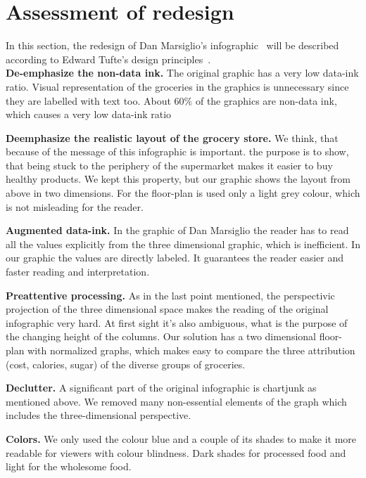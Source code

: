 \section{Assessment of redesign}

In this section, the redesign of Dan Marsiglio's
infographic~\cite{DanMarsiglio2008} will be described according to Edward
Tufte's design principles~\cite{Tufte2001}.\\

\textbf{De-emphasize the non-data ink.} The original graphic has a very
low data-ink ratio. Visual representation of the groceries in the graphics
is unnecessary since they are labelled with text too. About 60\% of
the graphics are non-data ink, which causes a very low data-ink ratio

\textbf{Deemphasize the realistic layout of the grocery store.} We
think, that because of the message of this infographic is important. the
purpose is to show, that being stuck to the periphery of the supermarket
makes it easier to buy healthy products. We kept this property, but our
graphic shows the layout from above in two dimensions. For the floor-plan is
used only a light grey colour, which is not misleading for the reader.

\textbf{Augmented data-ink.} In the graphic of Dan Marsiglio the reader
has to read all the values explicitly from the three dimensional graphic, which
is inefficient. In our graphic the values are directly labeled. It
guarantees the reader easier and faster reading and interpretation.

\textbf{Preattentive processing.} As in the last point mentioned, the
perspectivic projection of the three dimensional space makes the reading of
the original infographic very hard. At first sight it's also ambiguous,
what is the purpose of the changing height of the columns. Our solution
has a two dimensional floor-plan with normalized graphs, which makes easy to
compare the three attribution (cost, calories, sugar) of the diverse groups of
groceries.

\textbf{Declutter.} A significant part of the original infographic is chartjunk
as mentioned above. We removed many non-essential elements of the graph which
includes the three-dimensional perspective. 

\textbf{Colors.} We only used the colour blue and a couple of its shades to make
it more readable for viewers with colour blindness. Dark shades for processed
food and light for the wholesome food.\\

